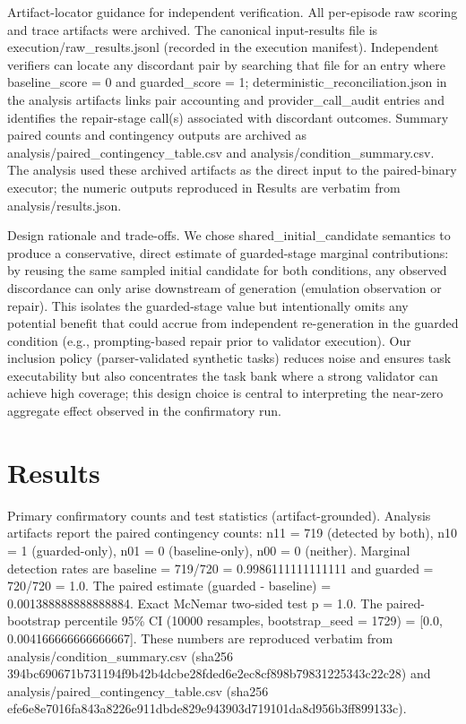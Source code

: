 \documentclass[conference]{IEEEtran}
\begin{document}
Artifact-locator guidance for independent verification. All per-episode raw scoring and trace artifacts were archived. The canonical input-results file is execution/raw\_results.jsonl (recorded in the execution manifest). Independent verifiers can locate any discordant pair by searching that file for an entry where baseline\_score = 0 and guarded\_score = 1; deterministic\_reconciliation.json in the analysis artifacts links pair accounting and provider\_call\_audit entries and identifies the repair-stage call(s) associated with discordant outcomes. Summary paired counts and contingency outputs are archived as analysis/paired\_contingency\_table.csv and analysis/condition\_summary.csv. The analysis used these archived artifacts as the direct input to the paired-binary executor; the numeric outputs reproduced in Results are verbatim from analysis/results.json.

Design rationale and trade-offs. We chose shared\_initial\_candidate semantics to produce a conservative, direct estimate of guarded-stage marginal contributions: by reusing the same sampled initial candidate for both conditions, any observed discordance can only arise downstream of generation (emulation observation or repair). This isolates the guarded-stage value but intentionally omits any potential benefit that could accrue from independent re-generation in the guarded condition (e.g., prompting-based repair prior to validator execution). Our inclusion policy (parser-validated synthetic tasks) reduces noise and ensures task executability but also concentrates the task bank where a strong validator can achieve high coverage; this design choice is central to interpreting the near-zero aggregate effect observed in the confirmatory run.

\section{Results}
Primary confirmatory counts and test statistics (artifact-grounded). Analysis artifacts report the paired contingency counts: n11 = 719 (detected by both), n10 = 1 (guarded-only), n01 = 0 (baseline-only), n00 = 0 (neither). Marginal detection rates are baseline = 719/720 = 0.9986111111111111 and guarded = 720/720 = 1.0. The paired estimate (guarded - baseline) = 0.001388888888888884. Exact McNemar two-sided test p = 1.0. The paired-bootstrap percentile 95\% CI (10000 resamples, bootstrap\_seed = 1729) = [0.0, 0.004166666666666667]. These numbers are reproduced verbatim from analysis/condition\_summary.csv (sha256 394bc690\allowbreak{}671b7311\allowbreak{}94f9b42b\allowbreak{}4dcbe28f\allowbreak{}ded6e2ec\allowbreak{}8cf898b7\allowbreak{}98312253\allowbreak{}43c22c28) and analysis/paired\_contingency\_table.csv (sha256 efe6e8e7\allowbreak{}016fa843\allowbreak{}a8226e91\allowbreak{}1dbde829\allowbreak{}e943903d\allowbreak{}719101da\allowbreak{}8d956b3f\allowbreak{}f899133c).
\end{document}
